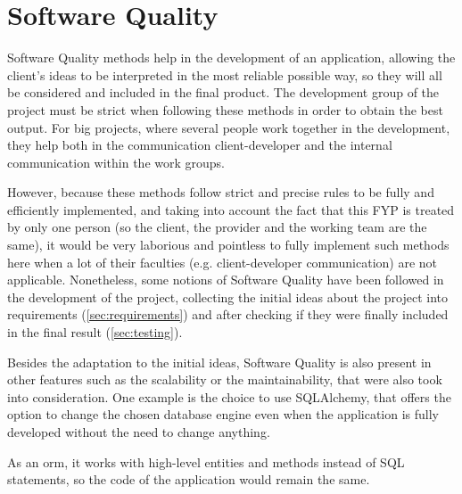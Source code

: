                                                                                              
\section{Software Quality}
Software Quality methods help in the development of an application, allowing the client's ideas to be interpreted in the most reliable possible way, so they will all be considered and included in the final product. The development group of the project must be strict when following these methods in order to obtain the best output. For big projects, where several people work together in the development, they help both in the communication client-developer and the internal communication within the work groups.

However, because these methods follow strict and precise rules to be fully and efficiently implemented, and taking into account the fact that this FYP is treated by only one person (so the client, the provider and the working team are the same), it would be very laborious and pointless to fully implement such methods here when a lot of their faculties (e.g. client-developer communication) are not applicable. Nonetheless, some notions of Software Quality have been followed in the development of the project, collecting the initial ideas about the project into requirements (\ref{sec:requirements}) and after checking if they were finally included in the final result (\ref{sec:testing}).

Besides the adaptation to the initial ideas, Software Quality is also present in other features such as the scalability or the maintainability, that were also took into consideration. One example is the choice to use SQLAlchemy, that offers the option to change the chosen database engine even when the application is fully developed without the need to change anything. 

As an \gls{orm}, it works with high-level entities and methods instead of SQL statements, so the code of the application would remain the same. 

